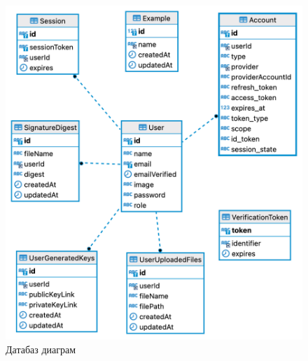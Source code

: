 

\begin{figure}[h!]
	\centering
	\includegraphics[scale=0.43]{assets/cryptography.png}
	\caption{Датабаз диаграм}
	\label{fig:dbdiagram}
\end{figure}
\break
\newpage

